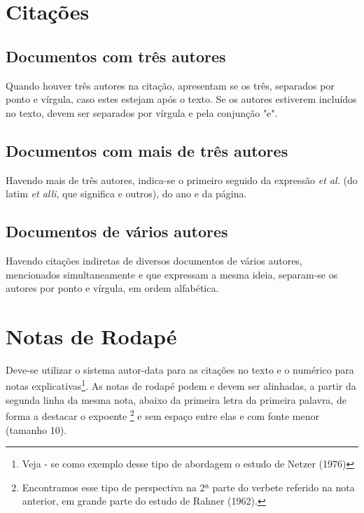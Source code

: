 \section{Citações}

\subsection{Documentos com três autores}

Quando houver três autores na citação, apresentam se os três, separados por ponto e vírgula, caso estes estejam após o texto. Se os autores estiverem incluídos no texto, devem ser separados por vírgula e pela conjunção "e".


\cite{tresautores}

\subsection{Documentos com mais de três autores}
Havendo mais de três autores, indica-se o primeiro seguido da expressão \textit{et al.} (do latim \textit{et alli}, que significa e outros), do ano e da página.


\cite{quatroautores}

\subsection{Documentos de vários autores}

Havendo    citações    indiretas de    diversos    documentos    de    vários    autores, mencionados  simultaneamente e  que  expressam  a  mesma  ideia,  separam-se  os  autores  por ponto e vírgula, em ordem alfabética.

\cite{tresautores, quatroautores}

\section{Notas de Rodap\'{e}}

Deve-se utilizar o sistema autor-data para as  citações no texto e o numérico para notas explicativas\footnote{Veja - se como exemplo desse tipo de abordagem o estudo de Netzer (1976)}. As notas de rodapé podem e devem ser alinhadas, a partir da segunda linha da mesma nota, abaixo da primeira letra da primeira palavra, de forma a destacar o expoente \footnote{Encontramos  esse  tipo  de  perspectiva  na  2ª  parte  do  verbete  referido  na  nota  anterior,  em  grande  parte  do estudo de Rahner (1962).} e sem espaço entre elas e com fonte menor (tamanho 10).
